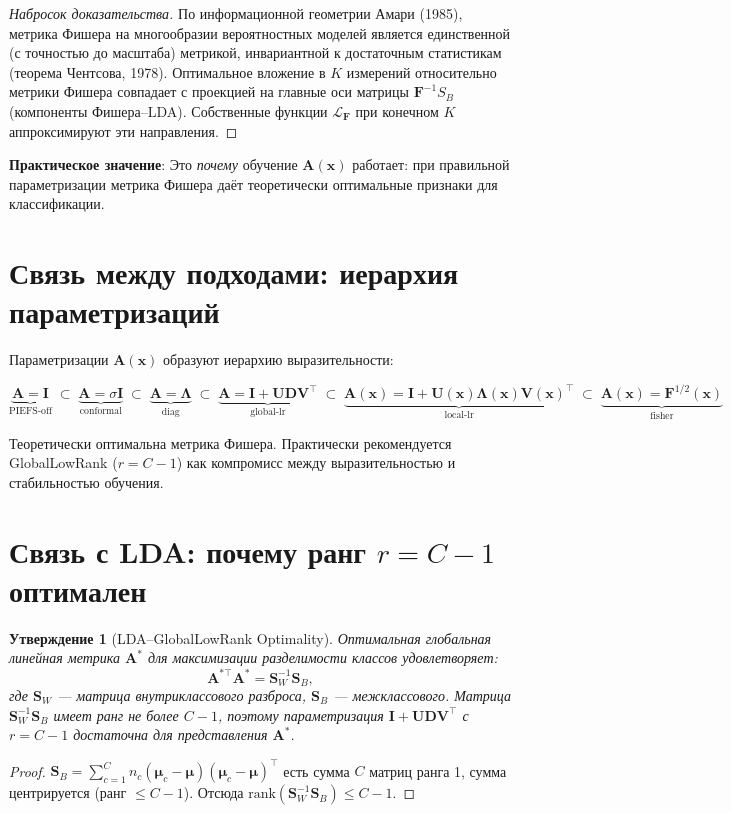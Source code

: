 \documentclass[14pt, a4paper, oneside]{extreport}
\theoremstyle{plain}
\newtheorem{proposition}[theorem]{Утверждение}
\theoremstyle{definition}
\begin{document}
\begin{proof}[Набросок доказательства]
По информационной геометрии Амари (1985), метрика Фишера на многообразии вероятностных моделей
является единственной (с точностью до масштаба) метрикой, инвариантной к достаточным статистикам
(теорема Чентсова, 1978). Оптимальное вложение в $K$ измерений относительно метрики Фишера
совпадает с проекцией на главные оси матрицы $\mathbf{F}^{-1}S_B$ (компоненты Фишера--LDA).
Собственные функции $\mathcal{L}_{\mathbf{F}}$ при конечном $K$ аппроксимируют эти направления.
\end{proof}

\noindent\textbf{Практическое значение}: Это \emph{почему} обучение $\mathbf{A}(\mathbf{x})$ работает: при правильной параметризации
метрика Фишера даёт теоретически оптимальные признаки для классификации.

\section{Связь между подходами: иерархия параметризаций}

Параметризации $\mathbf{A}(\mathbf{x})$ образуют иерархию выразительности:

\[
  \underbrace{\mathbf{A}=\mathbf{I}}_{\text{PIEFS-off}}
  \;\subset\;
  \underbrace{\mathbf{A}=\sigma\mathbf{I}}_{\text{conformal}}
  \;\subset\;
  \underbrace{\mathbf{A}=\boldsymbol{\Lambda}}_{\text{diag}}
  \;\subset\;
  \underbrace{\mathbf{A}=\mathbf{I}+\mathbf{U}\mathbf{D}\mathbf{V}^\top}_{\text{global-lr}}
  \;\subset\;
  \underbrace{\mathbf{A}(\mathbf{x})=\mathbf{I}+\mathbf{U}(\mathbf{x})\boldsymbol{\Lambda}(\mathbf{x})\mathbf{V}(\mathbf{x})^\top}_{\text{local-lr}}
  \;\subset\;
  \underbrace{\mathbf{A}(\mathbf{x})=\mathbf{F}^{1/2}(\mathbf{x})}_{\text{fisher}}
\]

Теоретически оптимальна метрика Фишера. Практически рекомендуется GlobalLowRank ($r = C-1$)
как компромисс между выразительностью и стабильностью обучения.

\section{Связь с LDA: почему ранг $r = C-1$ оптимален}

\begin{proposition}[LDA--GlobalLowRank Optimality]
Оптимальная глобальная линейная метрика $\mathbf{A}^*$ для максимизации разделимости классов удовлетворяет:
\[
  \mathbf{A}^{*\top}\mathbf{A}^* = \mathbf{S}_W^{-1}\mathbf{S}_B,
\]
где $\mathbf{S}_W$ — матрица внутриклассового разброса, $\mathbf{S}_B$ — межклассового.
Матрица $\mathbf{S}_W^{-1}\mathbf{S}_B$ имеет ранг не более $C-1$, поэтому
параметризация $\mathbf{I} + \mathbf{U}\mathbf{D}\mathbf{V}^\top$ с $r = C-1$ достаточна для представления $\mathbf{A}^*$.
\end{proposition}

\begin{proof}
$\mathbf{S}_B = \sum_{c=1}^C n_c (\boldsymbol{\mu}_c - \boldsymbol{\mu})(\boldsymbol{\mu}_c - \boldsymbol{\mu})^\top$ есть сумма $C$ матриц ранга 1,
сумма центрируется (ранг $\leq C-1$). Отсюда $\mathrm{rank}(\mathbf{S}_W^{-1}\mathbf{S}_B) \leq C-1$.
\end{proof}
\end{document}
